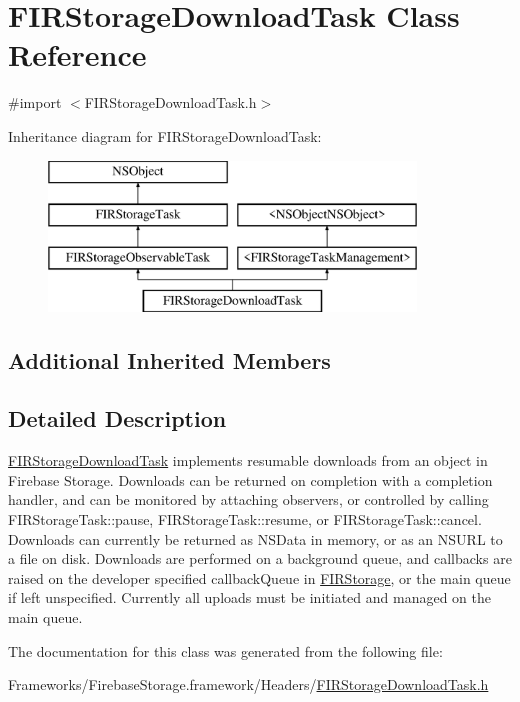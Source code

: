 \hypertarget{interface_f_i_r_storage_download_task}{}\section{F\+I\+R\+Storage\+Download\+Task Class Reference}
\label{interface_f_i_r_storage_download_task}


{\ttfamily \#import $<$F\+I\+R\+Storage\+Download\+Task.\+h$>$}

Inheritance diagram for F\+I\+R\+Storage\+Download\+Task\+:\begin{figure}[H]
\begin{center}
\leavevmode
\includegraphics[height=4.000000cm]{interface_f_i_r_storage_download_task}
\end{center}
\end{figure}
\subsection*{Additional Inherited Members}


\subsection{Detailed Description}
\hyperlink{interface_f_i_r_storage_download_task}{F\+I\+R\+Storage\+Download\+Task} implements resumable downloads from an object in Firebase Storage. Downloads can be returned on completion with a completion handler, and can be monitored by attaching observers, or controlled by calling F\+I\+R\+Storage\+Task\+::pause, F\+I\+R\+Storage\+Task\+::resume, or F\+I\+R\+Storage\+Task\+::cancel. Downloads can currently be returned as N\+S\+Data in memory, or as an N\+S\+U\+R\+L to a file on disk. Downloads are performed on a background queue, and callbacks are raised on the developer specified callback\+Queue in \hyperlink{interface_f_i_r_storage}{F\+I\+R\+Storage}, or the main queue if left unspecified. Currently all uploads must be initiated and managed on the main queue. 

The documentation for this class was generated from the following file\+:\begin{DoxyCompactItemize}
\item 
Frameworks/\+Firebase\+Storage.\+framework/\+Headers/\hyperlink{_f_i_r_storage_download_task_8h}{F\+I\+R\+Storage\+Download\+Task.\+h}\end{DoxyCompactItemize}
